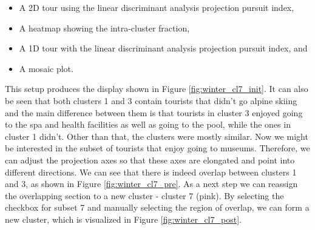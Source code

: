 \documentclass[article]{ajs}
\begin{document}
\begin{itemize}
    \item A 2D tour using the linear discriminant analysis projection pursuit index,
    \item A heatmap showing the intra-cluster fraction,
    \item A 1D tour with the linear discriminant analysis projection pursuit index, and
    \item A mosaic plot.
\end{itemize}

This setup produces the display shown in Figure \ref{fig:winter_cl7_init}. It can also be seen that both clusters 1 and 3 contain tourists that didn't go alpine skiing and the main difference between them is that tourists in cluster 3 enjoyed going to the spa and health facilities as well as going to the pool, while the ones in cluster 1 didn't. Other than that, the clusters were mostly similar. Now we might be interested in the subset of tourists that enjoy going to museums. Therefore, we can adjust the projection axes so that these axes are elongated and point into different directions. We can see that there is indeed overlap between clusters 1 and 3, as shown in Figure \ref{fig:winter_cl7_pre}. As a next step we can reassign the overlapping section to a new cluster - cluster 7 (pink). By selecting the checkbox for subset 7 and manually selecting the region of overlap, we can form a new cluster, which is visualized in Figure \ref{fig:winter_cl7_post}.
\end{document}
